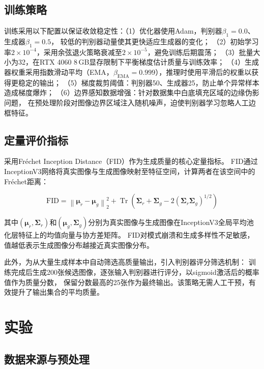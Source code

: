 \documentclass[12pt,a4paper]{ctexart}  %
\begin{document}
\subsection{训练策略}

训练采用以下配置以保证收敛稳定性：（1）优化器使用Adam，判别器$\beta_1 = 0.0$、生成器$\beta_1 = 0.5$，
较低的判别器动量使其更快适应生成器的变化\cite{radford2016dcgan}；
（2）初始学习率$2\times10^{-4}$，采用余弦退火策略衰减至$2\times10^{-5}$，避免训练后期震荡；
（3）批量大小为32，在RTX 4060 8\,GB显存限制下平衡梯度估计质量与训练效率；
（4）生成器权重采用指数滑动平均（EMA，$\beta_{\text{EMA}} = 0.999$），推理时使用平滑后的权重以获得更稳定的输出；
（5）梯度裁剪阈值：判别器50、生成器25，防止单个异常样本造成梯度爆炸；
（6）边界感知数据增强：针对数据集中白底填充区域的边缘伪影问题，
在预处理阶段对图像边界区域注入随机噪声，迫使判别器学习忽略人工边框特征。

\subsection{定量评价指标}

采用Fr\'{e}chet Inception Distance（FID）\cite{heusel2017gans}作为生成质量的核心定量指标。
FID通过InceptionV3网络将真实图像与生成图像映射至特征空间，计算两者在该空间中的Fr\'{e}chet距离：

\begin{equation}
    \text{FID} = \left\| \bm{\mu}_r - \bm{\mu}_g \right\|_2^2
    + \operatorname{Tr}\left( \bm{\Sigma}_r + \bm{\Sigma}_g - 2(\bm{\Sigma}_r \bm{\Sigma}_g)^{1/2} \right)
    \label{eq:fid}
\end{equation}

其中$(\bm{\mu}_r, \bm{\Sigma}_r)$和$(\bm{\mu}_g, \bm{\Sigma}_g)$分别为真实图像与生成图像在InceptionV3全局平均池化层特征上的均值向量与协方差矩阵。
FID对模式崩溃和生成多样性不足敏感，值越低表示生成图像分布越接近真实图像分布\cite{heusel2017gans}。

此外，为从大量生成样本中自动筛选高质量输出，引入判别器评分筛选机制\cite{shmelkov2018good}：
训练完成后生成200张候选图像，逐张输入判别器进行评分，以sigmoid激活后的概率值作为质量分数，
保留分数最高的25张作为最终输出。该策略无需人工干预，有效提升了输出集合的平均质量。

\section{实验}

\subsection{数据来源与预处理}
\end{document}
